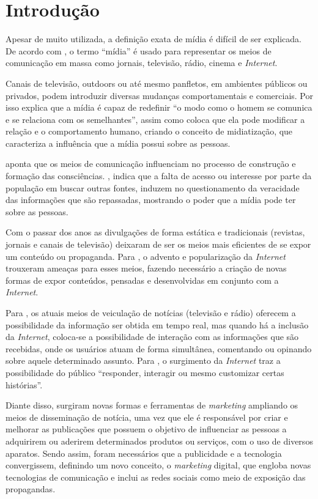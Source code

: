 \chapter[Introdução]{Introdução}
Apesar de muito utilizada, a definição exata de mídia é difícil de ser explicada. De acordo com \citet{guazina2007}, o termo ``mídia'' é usado para representar os meios de comunicação em massa como jornais, televisão, rádio, cinema e \textit{Internet}.

Canais de televisão, outdoors ou até mesmo panfletos, em ambientes públicos ou privados, podem introduzir diversas mudanças comportamentais e comerciais. Por isso \citet{escobar2007} explica que a mídia é capaz de redefinir ``o modo como o homem se comunica e se relaciona com os semelhantes'', assim como \citet{hjarvard2012} coloca que ela pode modificar a relação e o comportamento humano, criando o conceito de midiatização, que caracteriza a influência que a mídia possui sobre as pessoas.

\citet{guazina2007} aponta que os meios de comunicação influenciam no processo de construção e formação das consciências. \citet{silva2007}, indica que a falta de acesso ou interesse por parte da população em buscar outras fontes, induzem no questionamento da veracidade das informações que são repassadas, mostrando o poder que a mídia pode ter sobre as pessoas.

Com o passar dos anos as divulgações de forma estática e tradicionais (revistas, jornais e canais de televisão) deixaram de ser os meios mais eficientes de se expor um conteúdo ou propaganda. Para \citet{meditsch2001}, o advento e popularização da \textit{Internet} trouxeram ameaças para esses meios, fazendo necessário a criação de novas formas de expor conteúdos, pensadas e desenvolvidas em conjunto com a \textit{Internet}.

Para \citet{escobar2007}, os atuais meios de veiculação de notícias (televisão e rádio) oferecem a possibilidade da informação ser obtida em tempo real, mas quando há a inclusão da \textit{Internet}, coloca-se a possibilidade de interação com as informações que são recebidas, onde os usuários atuam de forma simultânea, comentando ou opinando sobre aquele determinado assunto. Para \citet{deuze2002}, o surgimento da \textit{Internet} traz a possibilidade do público ``responder, interagir ou mesmo customizar certas histórias''. 

Diante disso, surgiram novas formas e ferramentas de \textit{marketing} ampliando os meios de disseminação de notícia, uma vez que ele é responsável por criar e melhorar as publicações que possuem o objetivo de influenciar as pessoas a adquirirem ou aderirem determinados produtos ou serviços, com o uso de diversos aparatos. Sendo assim, foram necessários que a publicidade e a tecnologia convergissem, definindo um novo conceito, o \textit{marketing} digital, que engloba novas tecnologias de comunicação e inclui as redes sociais como meio de exposição das propagandas.

